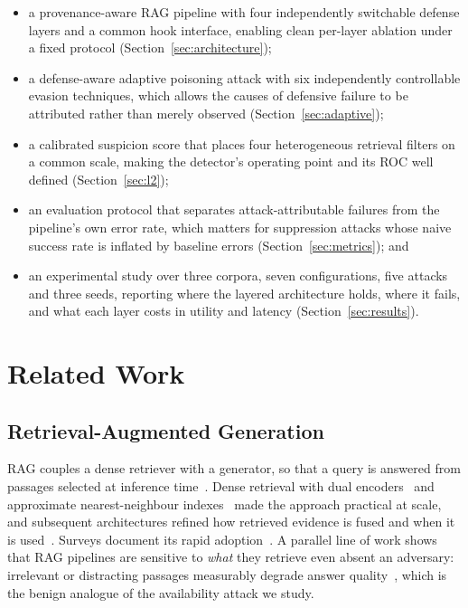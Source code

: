 \begin{itemize}
    \item a provenance-aware RAG pipeline with four independently switchable defense layers and
          a common hook interface, enabling clean per-layer ablation under a fixed protocol
          (Section~\ref{sec:architecture});
    \item a defense-aware adaptive poisoning attack with six independently controllable evasion
          techniques, which allows the causes of defensive failure to be attributed rather than
          merely observed (Section~\ref{sec:adaptive});
    \item a calibrated suspicion score that places four heterogeneous retrieval filters on a
          common scale, making the detector's operating point and its ROC well defined
          (Section~\ref{sec:l2});
    \item an evaluation protocol that separates attack-attributable failures from the
          pipeline's own error rate, which matters for suppression attacks whose naive success
          rate is inflated by baseline errors (Section~\ref{sec:metrics}); and
    \item an experimental study over three corpora, seven configurations, five attacks and
          three seeds, reporting where the layered architecture holds, where it fails, and what
          each layer costs in utility and latency (Section~\ref{sec:results}).
\end{itemize}

\section{Related Work}
\label{sec:related}

\subsection{Retrieval-Augmented Generation}

RAG couples a dense retriever with a generator, so that a query is answered from passages
selected at inference time~\citep{lewis2020,guu2020}. Dense retrieval with dual
encoders~\citep{karpukhin2020dpr,reimers2019sbert} and approximate nearest-neighbour
indexes~\citep{johnson2021faiss} made the approach practical at scale, and subsequent
architectures refined how retrieved evidence is fused and when it is
used~\citep{izacard2021fid,borgeaud2022retro,shi2023replug,asai2023selfrag}. Surveys
document its rapid adoption~\citep{gao2024survey}. A parallel line of work shows that RAG
pipelines are sensitive to \emph{what} they retrieve even absent an adversary: irrelevant or
distracting passages measurably degrade answer quality~\citep{yoran2024robust,cuconasu2024noise},
which is the benign analogue of the availability attack we study.

